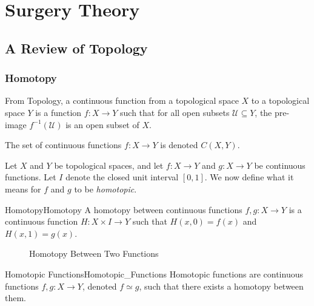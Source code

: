 \chapter{Surgery Theory}
    \section{A Review of Topology}
        \subsection{Homotopy}
            From Topology, a continuous function from a topological space $X$
            to a topological space $Y$ is a function $f:X\rightarrow{Y}$ such
            that for all open subsets $\mathcal{U}\subseteq{Y}$, the pre-image
            $f^{-1}(\mathcal{U})$ is an open subset of $X$.
            \begin{fnotation}{}{}
                The set of continuous functions $f:{X}\rightarrow{Y}$
                is denoted $C(X,Y)$.
            \end{fnotation}
            Let $X$ and $Y$ be topological spaces, and let
            $f:{X}\rightarrow{Y}$ and $g:{X}\rightarrow{Y}$ be continuous
            functions. Let $I$ denote the closed unit interval $[0,1]$. We now
            define what it means for $f$ and $g$ to be \textit{homotopic}.
            \begin{ldefinition}{Homotopy}{Homotopy}
                A homotopy between continuous functions
                $f,g:{X}\rightarrow{Y}$ is a continuous function
                $H:{X}\times{I}\rightarrow{Y}$ such that $H(x,0)=f(x)$ and
                $H(x,1)=g(x)$.
            \end{ldefinition}
            \begin{figure}[H]
                \centering
                \captionsetup{type=figure}
                
                \caption{Homotopy Between Two Functions}
                \label{fig:homotopy_diagram_for_depicting_homotopy}
            \end{figure}
            \begin{ldefinition}{Homotopic Functions}{Homotopic_Functions}
                Homotopic functions are continuous functions
                $f,g:{X}\rightarrow{Y}$, denoted ${f}\simeq{g}$,
                such that there exists a homotopy between them.
            \end{ldefinition}
